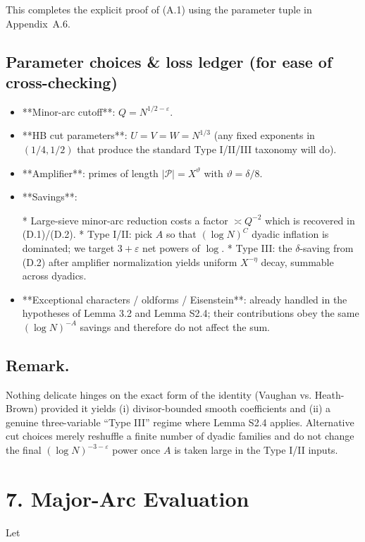 \documentclass[11pt]{article}
\theoremstyle{definition}
\theoremstyle{remark}
\begin{document}
This completes the explicit proof of (A.1) using the parameter tuple in Appendix~A.6.

\subsection*{Parameter choices \& loss ledger (for ease of cross-checking)}

\begin{itemize}
\item **Minor-arc cutoff**: $Q=N^{1/2-\varepsilon}$.
\item **HB cut parameters**: $U=V=W=N^{1/3}$ (any fixed exponents in $(1/4,1/2)$ that produce the standard Type I/II/III taxonomy will do).
\item **Amplifier**: primes of length $|\mathcal P|=X^\vartheta$ with $\vartheta=\delta/8$.
\item **Savings**:

  * Large-sieve minor-arc reduction costs a factor $\asymp Q^{-2}$ which is recovered in (D.1)/(D.2).
  * Type I/II: pick $A$ so that $(\log N)^C$ dyadic inflation is dominated; we target $3+\varepsilon$ net powers of $\log$.
  * Type III: the $\delta$-saving from (D.2) after amplifier normalization yields uniform $X^{-\eta}$ decay, summable across dyadics.
\item **Exceptional characters / oldforms / Eisenstein**: already handled in the hypotheses of Lemma 3.2 and Lemma S2.4; their contributions obey the same $(\log N)^{-A}$ savings and therefore do not affect the sum.
\end{itemize}

\subsection*{Remark.}

Nothing delicate hinges on the exact form of the identity (Vaughan vs. Heath-Brown) provided it yields (i) divisor-bounded smooth coefficients and (ii) a genuine three-variable “Type III” regime where Lemma S2.4 applies. Alternative cut choices merely reshuffle a finite number of dyadic families and do not change the final $(\log N)^{-3-\varepsilon}$ power once $A$ is taken large in the Type I/II inputs.

\section*{7. Major-Arc Evaluation}

Let
\end{document}
